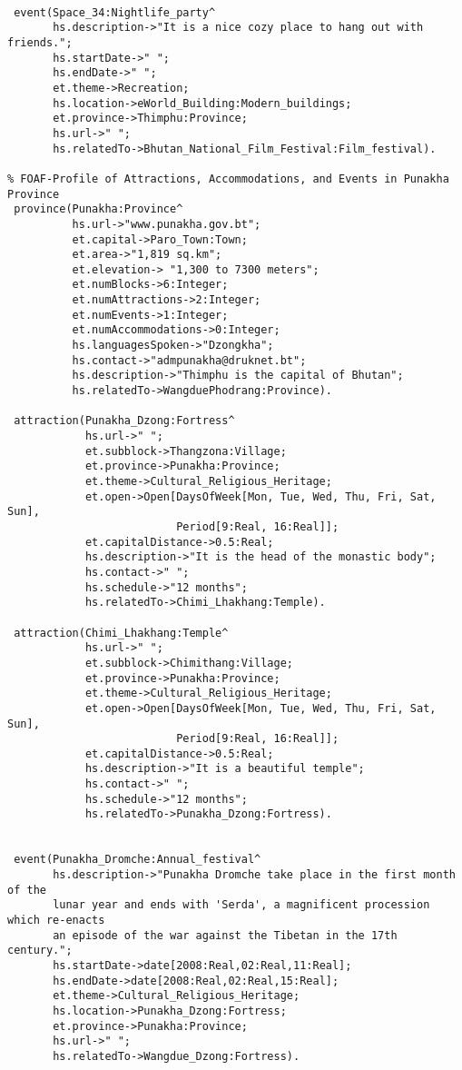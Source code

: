\begin{verbatim}
 
 event(Space_34:Nightlife_party^
       hs.description->"It is a nice cozy place to hang out with friends.";
       hs.startDate->" ";
       hs.endDate->" ";
       et.theme->Recreation;
       hs.location->eWorld_Building:Modern_buildings;
       et.province->Thimphu:Province;
       hs.url->" ";
       hs.relatedTo->Bhutan_National_Film_Festival:Film_festival).
             
% FOAF-Profile of Attractions, Accommodations, and Events in Punakha Province
 province(Punakha:Province^
          hs.url->"www.punakha.gov.bt";
          et.capital->Paro_Town:Town;
          et.area->"1,819 sq.km";
          et.elevation-> "1,300 to 7300 meters";
          et.numBlocks->6:Integer;
          et.numAttractions->2:Integer;
          et.numEvents->1:Integer;
          et.numAccommodations->0:Integer;
          hs.languagesSpoken->"Dzongkha";
          hs.contact->"admpunakha@druknet.bt";
          hs.description->"Thimphu is the capital of Bhutan";
          hs.relatedTo->WangduePhodrang:Province).
   
 attraction(Punakha_Dzong:Fortress^
            hs.url->" ";
            et.subblock->Thangzona:Village;
            et.province->Punakha:Province;
            et.theme->Cultural_Religious_Heritage;
            et.open->Open[DaysOfWeek[Mon, Tue, Wed, Thu, Fri, Sat, Sun],
                          Period[9:Real, 16:Real]];
            et.capitalDistance->0.5:Real;
            hs.description->"It is the head of the monastic body";
            hs.contact->" ";
            hs.schedule->"12 months";
            hs.relatedTo->Chimi_Lhakhang:Temple).

 attraction(Chimi_Lhakhang:Temple^
            hs.url->" ";
            et.subblock->Chimithang:Village;
            et.province->Punakha:Province;
            et.theme->Cultural_Religious_Heritage;
            et.open->Open[DaysOfWeek[Mon, Tue, Wed, Thu, Fri, Sat, Sun],
                          Period[9:Real, 16:Real]];
            et.capitalDistance->0.5:Real;
            hs.description->"It is a beautiful temple";
            hs.contact->" ";
            hs.schedule->"12 months";
            hs.relatedTo->Punakha_Dzong:Fortress).


 event(Punakha_Dromche:Annual_festival^
       hs.description->"Punakha Dromche take place in the first month of the 
       lunar year and ends with 'Serda', a magnificent procession which re-enacts 
       an episode of the war against the Tibetan in the 17th century.";
       hs.startDate->date[2008:Real,02:Real,11:Real];
       hs.endDate->date[2008:Real,02:Real,15:Real];
       et.theme->Cultural_Religious_Heritage;
       hs.location->Punakha_Dzong:Fortress;
       et.province->Punakha:Province;
       hs.url->" ";
       hs.relatedTo->Wangdue_Dzong:Fortress).
                                                

\end{verbatim}
